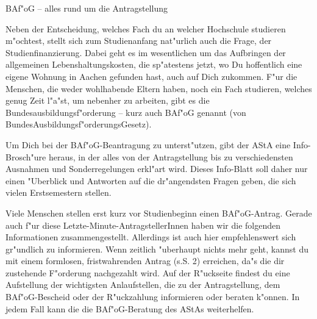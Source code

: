 \begin{artikel}{BAf"oG -- alles rund um die Antragstellung}
\begin{window}
Neben der Entscheidung, welches Fach du an welcher Hochschule studieren m"ochtest, stellt sich zum Studienanfang nat"urlich auch die Frage, der Studienfinanzierung. Dabei geht es im wesentlichen um das Aufbringen der allgemeinen Lebenshaltungskosten, die sp"atestens jetzt, wo Du hoffentlich eine eigene Wohnung in Aachen gefunden hast, auch auf Dich zukommen. F"ur die Menschen, die weder wohlhabende Eltern haben, noch ein Fach studieren, welches genug Zeit l"a"st, um nebenher zu arbeiten, gibt es die Bundesausbildungsf"orderung -- kurz auch BAf"oG genannt (von BundesAusbildungsf"orderungsGesetz).

Um Dich bei der BAf"oG-Beantragung zu unterst"utzen, gibt der AStA eine Info-Brosch"ure heraus, in der alles von der Antragstellung bis zu verschiedensten Ausnahmen und Sonderregelungen erkl"art wird. Dieses Info-Blatt soll daher nur einen "Uberblick und Antworten auf die dr"angendsten Fragen geben, die sich vielen Erstsemestern stellen.

Viele Menschen stellen erst kurz vor Studienbeginn einen BAf"oG-Antrag. Gerade auch f"ur diese Letzte-Minute-AntragstellerInnen haben wir die folgenden Informationen zusammengestellt.
Allerdings ist auch hier empfehlenswert sich gr"undlich zu informieren. Wenn zeitlich "uberhaupt nichts mehr geht, kannst du mit einem formlosen, fristwahrenden Antrag (s.S. 2) erreichen, da"s
die dir zustehende F"orderung nachgezahlt wird. Auf der R"uckseite findest du eine Aufstellung der wichtigsten Anlaufstellen, die zu der Antragstellung, dem BAf"oG-Bescheid oder der R"uckzahlung informieren oder beraten k"onnen. In jedem Fall kann die die BAf"oG-Beratung des AStAs weiterhelfen.
\end{window}
\end{artikel}
